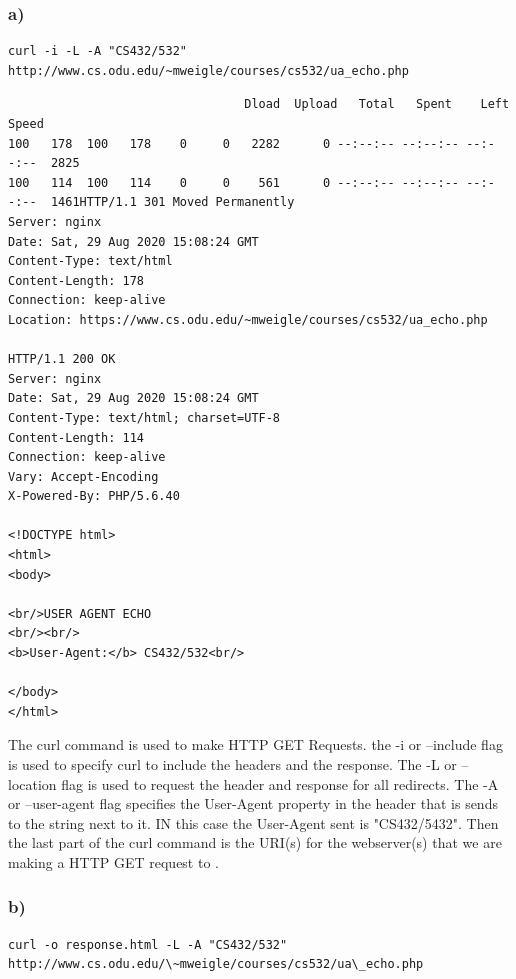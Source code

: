 \documentclass[12pt]{article}
\begin{document}
\subsubsection*{a)}
\begin{lstlisting}[numbers=none, caption=Command, label=lst:q2ACommand]
curl -i -L -A "CS432/532" http://www.cs.odu.edu/~mweigle/courses/cs532/ua_echo.php
\end{lstlisting}
\begin{lstlisting}[numbers=none,
		        caption={curl command to get the GET response and header, redirects and send a User-Agent header propety}, 
			label=lst:q2AResponse]
  % Total    % Received % Xferd  Average Speed   Time    Time     Time  Current
                                 Dload  Upload   Total   Spent    Left  Speed
100   178  100   178    0     0   2282      0 --:--:-- --:--:-- --:--:--  2825
100   114  100   114    0     0    561      0 --:--:-- --:--:-- --:--:--  1461HTTP/1.1 301 Moved Permanently
Server: nginx
Date: Sat, 29 Aug 2020 15:08:24 GMT
Content-Type: text/html
Content-Length: 178
Connection: keep-alive
Location: https://www.cs.odu.edu/~mweigle/courses/cs532/ua_echo.php

HTTP/1.1 200 OK
Server: nginx
Date: Sat, 29 Aug 2020 15:08:24 GMT
Content-Type: text/html; charset=UTF-8
Content-Length: 114
Connection: keep-alive
Vary: Accept-Encoding
X-Powered-By: PHP/5.6.40

<!DOCTYPE html>
<html>
<body>

<br/>USER AGENT ECHO
<br/><br/>
<b>User-Agent:</b> CS432/532<br/>

</body>
</html>
\end{lstlisting}

The curl command is used to make HTTP GET Requests. the -i  or --include flag is used to specify curl to include the headers and the response. The -L or --location flag is used to request the header 
and response for all redirects. The -A or --user-agent flag specifies the User-Agent property in the header that is sends to the string next to it. IN this case the User-Agent sent is "CS432/5432".
Then the last part of the curl command is the URI(s) for the webserver(s) that we are making a HTTP GET request to \cite{curlManPage}.

\subsubsection*{b)}
\begin{lstlisting}[numbers=none, caption=curl command to get headers only for all redirects and sets the User-Agent header property, label=lst:q2BCommand]
curl -o response.html -L -A "CS432/532" http://www.cs.odu.edu/\~mweigle/courses/cs532/ua\_echo.php
\end{lstlisting}
\end{document}
